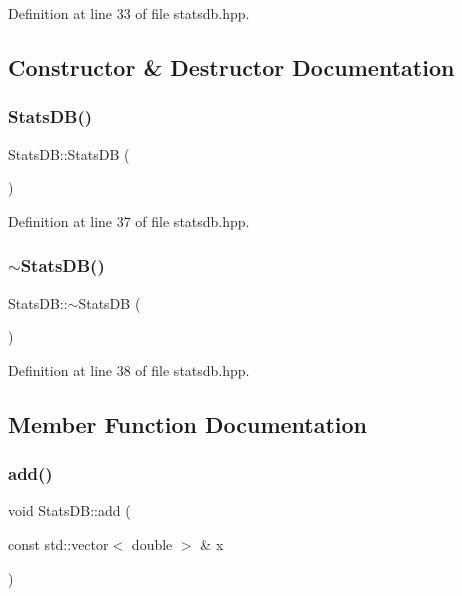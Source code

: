 Definition at line 33 of file statsdb.\+hpp.



\subsection{Constructor \& Destructor Documentation}
\mbox{\label{class_stats_d_b_a454159e71dfe6af418dfdd8704c38c8c}} 
\subsubsection{\texorpdfstring{Stats\+D\+B()}{StatsDB()}}
{\footnotesize\ttfamily Stats\+D\+B\+::\+Stats\+DB (\begin{DoxyParamCaption}{ }\end{DoxyParamCaption})\hspace{0.3cm}{\ttfamily [inline]}}



Definition at line 37 of file statsdb.\+hpp.

\mbox{\label{class_stats_d_b_ab4a9371d706b7418df5cb44e81fb5429}} 
\subsubsection{\texorpdfstring{$\sim$\+Stats\+D\+B()}{~StatsDB()}}
{\footnotesize\ttfamily Stats\+D\+B\+::$\sim$\+Stats\+DB (\begin{DoxyParamCaption}{ }\end{DoxyParamCaption})\hspace{0.3cm}{\ttfamily [inline]}}



Definition at line 38 of file statsdb.\+hpp.



\subsection{Member Function Documentation}
\mbox{\label{class_stats_d_b_a5759e17b759fcafeec7601188aaa8266}} 
\subsubsection{\texorpdfstring{add()}{add()}}
{\footnotesize\ttfamily void Stats\+D\+B\+::add (\begin{DoxyParamCaption}\item[{const std\+::vector$<$ double $>$ \&}]{x }\end{DoxyParamCaption})\hspace{0.3cm}{\ttfamily [inline]}}



